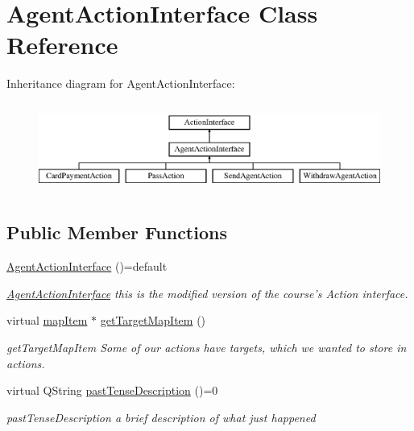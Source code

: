 \hypertarget{class_agent_action_interface}{\section{Agent\-Action\-Interface Class Reference}
\label{class_agent_action_interface}
}
Inheritance diagram for Agent\-Action\-Interface\-:\begin{figure}[H]
\begin{center}
\leavevmode
\includegraphics[height=2.978723cm]{class_agent_action_interface}
\end{center}
\end{figure}
\subsection*{Public Member Functions}
\begin{DoxyCompactItemize}
\item 
\hypertarget{class_agent_action_interface_a31c983273793ac196ae185e112625829}{\hyperlink{class_agent_action_interface_a31c983273793ac196ae185e112625829}{Agent\-Action\-Interface} ()=default}\label{class_agent_action_interface_a31c983273793ac196ae185e112625829}

\begin{DoxyCompactList}\small\item\em \hyperlink{class_agent_action_interface}{Agent\-Action\-Interface} this is the modified version of the course's Action interface. \end{DoxyCompactList}\item 
virtual \hyperlink{classmap_item}{map\-Item} $\ast$ \hyperlink{class_agent_action_interface_a0fecde84d3d50533ecc26fbc44bb746d}{get\-Target\-Map\-Item} ()
\begin{DoxyCompactList}\small\item\em get\-Target\-Map\-Item Some of our actions have targets, which we wanted to store in actions. \end{DoxyCompactList}\item 
virtual Q\-String \hyperlink{class_agent_action_interface_a940bd8035e48c8682eb030be937df6e6}{past\-Tense\-Description} ()=0
\begin{DoxyCompactList}\small\item\em past\-Tense\-Description a brief description of what just happened \end{DoxyCompactList}\end{DoxyCompactItemize}


